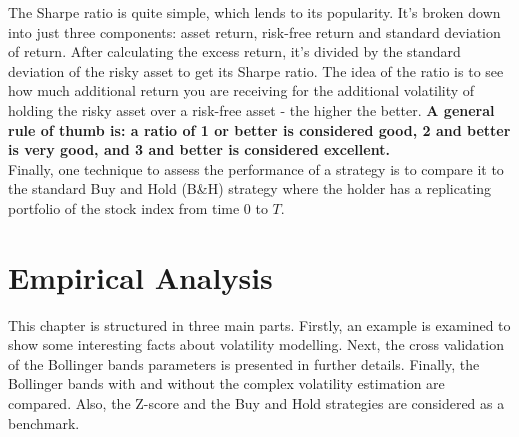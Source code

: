 \documentclass[11pt,a4,twosided,singlespacing,titlepagenumber=on]{scrreprt}
\numberwithin{equation}{chapter} %
\theoremstyle{remark}
\begin{document}
The Sharpe ratio is quite simple, which lends to its popularity. It's broken down into just three components: asset return, risk-free return and standard deviation of return. After calculating the excess return, it's divided by the standard deviation of the risky asset to get its Sharpe ratio. The idea of the ratio is to see how much additional return you are receiving for the additional volatility of holding the risky asset over a risk-free asset - the higher the better. \textbf{A general rule of thumb is: a ratio of 1 or better is considered good, 2 and better is very good, and 3 and better is considered excellent.} \\

Finally, one technique to assess the performance of a strategy is to compare it to the standard Buy and Hold (B\&H) strategy where the holder has a replicating portfolio of the stock index from time 0 to $T$.

\chapter{Empirical Analysis}
This chapter is structured in three main parts. Firstly, an example is examined to show some interesting facts about volatility modelling. Next, the cross validation of the Bollinger bands parameters is presented in further details. Finally, the Bollinger bands with and without the complex volatility estimation are compared. Also, the Z-score and the Buy and Hold strategies are considered as a benchmark.
\end{document}

